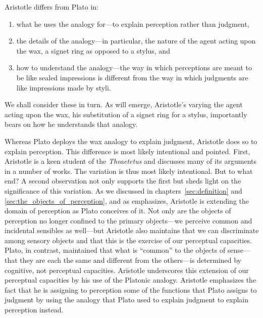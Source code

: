 Aristotle differs from Plato in:
\begin{enumerate}[(1)]
	\item what he uses the analogy for---to explain perception rather than judgment,
	\item the details of the analogy---in particular, the nature of the agent acting upon the wax, a signet ring as opposed to a stylus, and
	\item how to understand the analogy---the way in which perceptions are meant to be like sealed impressions is different from the way in which judgments are like impressions made by styli.
\end{enumerate}
We shall consider these in turn. As will emerge, Aristotle's varying the agent acting upon the wax, his substitution of a signet ring for a stylus, importantly bears on how he understands that analogy.

Whereas Plato deploys the wax analogy to explain judgment, Aristotle does so to explain perception. This difference is most likely intentional and pointed. First, Aristotle is a keen student of the \emph{Theaetetus} and discusses many of its arguments in a number of works. The variation is thus most likely intentional. But to what end? A second observation not only supports the first but sheds light on the significance of this variation. As we discussed in chapters~\ref{sec:definition} and \ref{sec:the_objects_of_perception}, and as \citet{Sorabji:1971fr,Sorabji:2003fk} emphasizes, Aristotle is extending the domain of perception as Plato conceives of it. Not only are the objects of perception no longer confined to the primary objects---we perceive common and incidental sensibles as well---but Aristotle also maintains that we can discriminate among sensory objects and that this is the exercise of our perceptual capacities. Plato, in contrast, maintained that what is ``common'' to the objects of sense---that they are each the same and different from the others---is determined by cognitive, not perceptual capacities. Aristotle underscores this extension of our perceptual capacities by his use of the Platonic analogy. Aristotle emphasizes the fact that he is assigning to perception some of the functions that Plato assigns to judgment by using the analogy that Plato used to explain judgment to explain perception instead.

